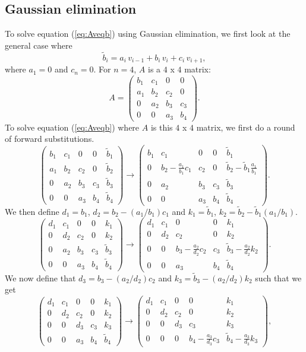 \documentclass[norsk,a4paper,12pt]{article}
\begin{document}
\subsection{Gaussian elimination}
To solve equation (\ref{eq:Aveqb}) using Gaussian elimination, we first look at the general case where $$\tilde{
b}_i = a_i\,v_{i-1} + b_i\,v_i + c_i\,v_{i+1},$$ where $a_1=0$ and $c_n=0$.
For $n=4$, $A$ is a $4$ x $4$ matrix:
$$A = \begin{pmatrix}
b_1&c_1&0&0\\
a_1&b_2&c_2&0\\
0&a_2&b_3&c_3\\
0&0&a_3&b_4
\end{pmatrix}.
$$
To solve equation (\ref{eq:Aveqb}) where $A$ is this $4$ x $4$ matrix, we first do a round of forward substitutions.
$$\begin{pmatrix}
b_1&c_1&0&0&\tilde{b}_1\\
a_1&b_2&c_2&0&\tilde{b}_2\\
0&a_2&b_3&c_3&\tilde{b}_3\\
0&0&a_3&b_4&\tilde{b}_4
\end{pmatrix} \rightarrow \begin{pmatrix}
b_1&c_1&0&0&\tilde{b}_1\\
0&b_2-\frac{a_1}{b_1}c_1&c_2&0&\tilde{b}_2-\tilde{b}_1\frac{a_1}{b_1}\\
0&a_2&b_3&c_3&\tilde{b}_3\\
0&0&a_3&b_4&\tilde{b}_4
\end{pmatrix}.$$
We then define $d_1=b_1$, $d_2=b_2-(a_1/b_1)c_1$ and $k_1=\tilde{b}_1$, $k_2=\tilde{b}_2-\tilde{b}_1(a_1/b_1)$. 
$$\begin{pmatrix}
d_1&c_1&0&0&k_1\\
0&d_2&c_2&0&k_2\\
0&a_2&b_3&c_3&\tilde{b}_3\\
0&0&a_3&b_4&\tilde{b}_4
\end{pmatrix} \rightarrow \begin{pmatrix}
d_1&c_1&0&0&k_1\\
0&d_2&c_2&0&k_2\\
0&0&b_3-\frac{a_2}{d_2}c_2&c_3&\tilde{b}_3-\frac{a_2}{d_2}k_2\\
0&0&a_3&b_4&\tilde{b}_4
\end{pmatrix}.$$
We now define that $d_3 = b_3-(a_2/d_2)c_2$ and $k_3=\tilde{b}_3-(a_2/d_2)k_2$ such that we get
$$\begin{pmatrix}
d_1&c_1&0&0&k_1\\
0&d_2&c_2&0&k_2\\
0&0&d_3&c_3&k_3\\
0&0&a_3&b_4&\tilde{b}_4
\end{pmatrix}\rightarrow \begin{pmatrix}
d_1&c_1&0&0&k_1\\
0&d_2&c_2&0&k_2\\
0&0&d_3&c_3&k_3\\
0&0&0&b_4-\frac{a_3}{d_3}c_3&\tilde{b}_4-\frac{a_3}{d_3}k_3
\end{pmatrix},$$
\end{document}
